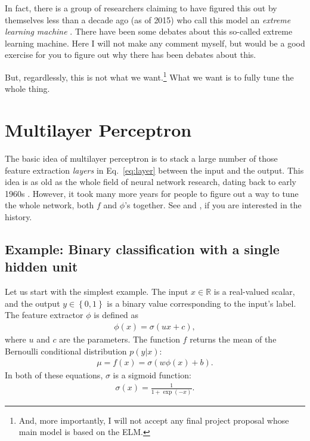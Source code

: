 \documentclass{report}
\newcommand{\RR}[0]{\mathbb{R}}
\begin{document}
In fact, there is a group of researchers claiming to have figured this out by
themselves less than a decade ago (as of 2015) who call this model an {\em
extreme learning machine} \citep{Huang2006}. There have been some debates about
this so-called extreme learning machine. Here I will not make any comment
myself, but would be a good exercise for you to figure out why there has been
debates about this.

But, regardlessly, this is not what we want.\footnote{
    And, more importantly, I will not accept any final project proposal whose
    main model is based on the ELM.
}
What we want is to fully tune the whole thing.

\section{Multilayer Perceptron}
\label{sec:mlp}

The basic idea of multilayer perceptron is to stack a large number of those
feature extraction {\em layers} in Eq.~\eqref{eq:layer} between the input and
the output. This idea is as old as the whole field of neural network research,
dating back to early 1960s \citep{Rosenblatt1962}. However, it took many more
years for people to figure out a way to tune the whole network, both $f$ and
$\phi$'s together. See \citet{schmidhuber2015deep} and \citet{lecun2015deep}, if you
are interested in the history.

\subsection{Example: Binary classification with a single hidden unit}

Let us start with the simplest example. The input $x \in \RR$ is a real-valued
scalar, and the output $y \in \left\{0,1\right\}$ is a binary value
corresponding to the input's label. The feature extractor $\phi$ is defined as
\begin{align}
    \label{eq:phi}
    \phi(x) = \sigma(u x + c),
\end{align}
where $u$ and $c$ are the parameters. The function $f$ returns the mean of the
Bernoulli conditional distribution $p(y|x)$:
\begin{align}
    \label{eq:f}
    \mu = f(x) = \sigma(w \phi(x) + b).
\end{align}
In both of these equations, $\sigma$ is a sigmoid function:
\begin{align}
    \label{eq:sigmoid}
    \sigma(x) = \frac{1}{1+\exp(-x)}.
\end{align}
\end{document}
